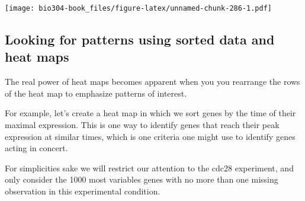 \documentclass[]{book}
\newenvironment{Shaded}{\begin{snugshade}}{\end{snugshade}}
\newcommand{\DataTypeTok}[1]{\textcolor[rgb]{0.13,0.29,0.53}{#1}}
\newcommand{\FloatTok}[1]{\textcolor[rgb]{0.00,0.00,0.81}{#1}}
\newcommand{\KeywordTok}[1]{\textcolor[rgb]{0.13,0.29,0.53}{\textbf{#1}}}
\newcommand{\NormalTok}[1]{#1}
\newcommand{\OperatorTok}[1]{\textcolor[rgb]{0.81,0.36,0.00}{\textbf{#1}}}
\newcommand{\StringTok}[1]{\textcolor[rgb]{0.31,0.60,0.02}{#1}}
\theoremstyle{definition}
\theoremstyle{definition}
\theoremstyle{definition}
\theoremstyle{remark}
\begin{document}
\begin{Shaded}
\end{Shaded}

\texttt{[image: bio304-book\_files/figure-latex/unnamed-chunk-286-1.pdf]}

\hypertarget{looking-for-patterns-using-sorted-data-and-heat-maps}{%
\subsection{Looking for patterns using sorted data and heat
maps}\label{looking-for-patterns-using-sorted-data-and-heat-maps}}

The real power of heat maps becomes apparent when you you rearrange the
rows of the heat map to emphasize patterns of interest.

For example, let's create a heat map in which we sort genes by the time
of their maximal expression. This is one way to identify genes that
reach their peak expression at similar times, which is one criteria one
might use to identify genes acting in concert.

For simplicities sake we will restrict our attention to the cdc28
experiment, and only consider the 1000 most variables genes with no more
than one missing observation in this experimental condition.
\end{document}
